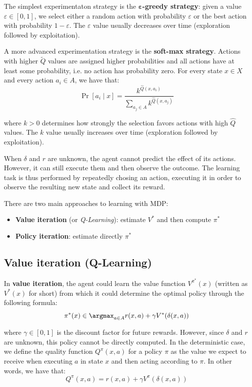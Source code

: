\documentclass[a4paper, 12pt]{report}
\begin{document}
    The simplest experimentaton strategy is the \textbf{$\mathbf{\varepsilon}$-greedy strategy}: given a value $\varepsilon \in [0,1]$, we select either a random action with probability $\varepsilon$ or the best action with probability $1-\varepsilon$. The $\varepsilon$ value usually decreases over time (exploration followed by exploitation).

    A more advanced experimentation strategy is the \textbf{soft-max strategy}. Actions with higher $\widetilde{Q}$ values are assigned higher probabilities and all actions have at least some probability, i.e. no action has probability zero. For every state $x \in X$ and every action $a_i \in A$, we have that:
    \[\Pr[a_i \mid x] = \frac{k^{\widehat{Q}(x,a_i)}}{\sum_{a_j \in A} k^{\widehat{Q}(x,a_j)}}\]

    where $k > 0$ determines how strongly the selection favors actions with high $\widehat{Q}$ values. The $k$ value usually increases over time (exploration followed by exploitation).

    When $\delta$ and $r$ are unknown, the agent cannot predict the effect of its actions. However, it can still execute them and then observe the outcome. The learning task is thus performed by repeatedly chosing an action, executing it in order to observe the resulting new state and collect its reward.

    There are two main approaches to learning with MDP:
    \begin{itemize}
        \item \textbf{Value iteration} (or \textit{Q-Learning}): estimate $V^*$ and then compute $\pi^*$
        \item \textbf{Policy iteration}: estimate directly $\pi^*$
    \end{itemize}

    \subsection{Value iteration (Q-Learning)}

    In \textbf{value iteration}, the agent could learn the value function $V^{\pi^*}(x)$ (written as $V^*(x)$ for short) from which it could determine the optimal policy through the following formula:
    \[\pi^*(x) \in \argmax_{a \in A} r(x,a) + \gamma V^*(\delta(x,a))\]

    where $\gamma \in [0,1]$ is the discount factor for future rewards. However, since $\delta$ and $r$ are unknown, this policy cannot be directly computed. In the deterministic case, we define the quality function $Q^{\pi}(x,a)$ for a policy $\pi$ as the value we expect to receive when executing $a$ in state $x$ and then acting according to $\pi$. In other words, we have that:
    \[Q^{\pi}(x,a) = r(x,a) + \gamma V^{\pi}(\delta(x,a))\]
\end{document}
